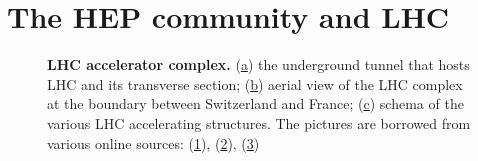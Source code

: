 \section{The HEP community and LHC}
\begin{figure}
    \centering
    
    \caption{\textbf{LHC accelerator complex.} (\hyperref[fig:lhc:pipes]{a}) the underground tunnel that hosts LHC and its transverse section;
    (\hyperref[fig:lhc:location]{b}) aerial view of the LHC complex at the boundary between Switzerland and France; (\hyperref[fig:lhc:schema]{c}) schema of the various LHC accelerating structures. The pictures are borrowed from various online sources: (\href{https://www.ansa.it/scienza/notizie/rubriche/fisica/2015/03/12/lacceleratore-lhc-pronto-a-ripartire-entro-2-settimane_60eed799-e47a-46e3-8908-056254a03a26.html?idPhoto=1}{1}), (\href{https://aec-analisiecalcolo.it/pubblicazioni/aec/86/656/}{2}), (\href{https://home.cern/science/accelerators/accelerator-complex}{3})
    }
    \label{fig:lhc}
\end{figure}

